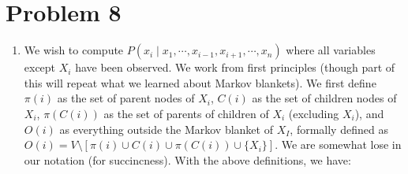 \documentclass[12pt]{article}
\begin{document}
\pagebreak
\section*{Problem 8}

\begin{enumerate}
\item We wish to compute $P(x_i \mid x_1, \cdots, x_{i-1}, x_{i+1}, \cdots, x_n)$ where all variables except $X_i$ have been observed. We work from first principles (though part of this will repeat what we learned about Markov blankets). We first define $\pi(i)$ as the set of parent nodes of $X_i$, $C(i)$ as the set of children nodes of $X_i$, $\pi(C(i))$ as the set of parents of children of $X_i$ (excluding $X_i$), and $O(i)$ as everything outside the Markov blanket of $X_I$, formally defined as $O(i) = V \setminus[\pi(i) \cup C(i) \cup \pi(C(i)) \cup \{X_i\}]$. We are somewhat lose in our notation (for succincness). With the above definitions, we have:


\end{enumerate}
\end{document}
